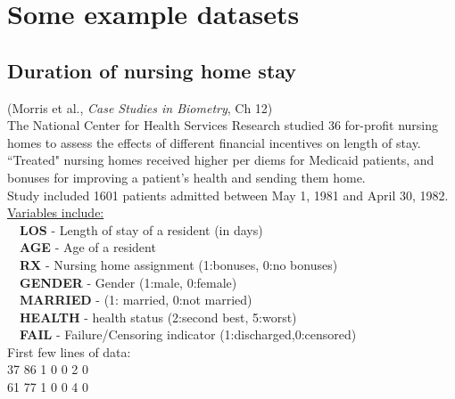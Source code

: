 \documentclass[11pt,slidesonly,semrot,portrait,palatino]{book}
\begin{document}
\section{Some example datasets}
\subsection{Duration of nursing home stay}
(Morris et al., {\em Case Studies in Biometry}, Ch 12)
\\[2ex]
The National Center for Health Services Research studied 36
for-profit nursing homes to assess the effects of
different financial incentives on length of stay.  ``Treated"
nursing homes received higher per diems for Medicaid patients,
and bonuses for improving a patient's health and sending them home.
\\[2ex]
Study included 1601 patients admitted between May 1, 1981 and
April 30, 1982.\\[2ex]
\underline{Variables include:} \\[2ex]
~~{\bf LOS} - Length of stay of a resident (in days)\\
~~{\bf AGE} - Age of a resident\\
~~{\bf RX} - Nursing home assignment (1:bonuses, 0:no bonuses)\\
~~{\bf GENDER} - Gender (1:male, 0:female)\\
~~{\bf MARRIED} - (1: married, 0:not married)\\
~~{\bf HEALTH} - health status (2:second best, 5:worst)\\
~~{\bf FAIL} - Failure/Censoring indicator (1:discharged,0:censored)
\\[2ex]
First few lines of data: \\[2ex]
37 86 1 0 0 2 0\\[2ex]
61 77 1 0 0 4 0\\[2ex]
\end{document}
